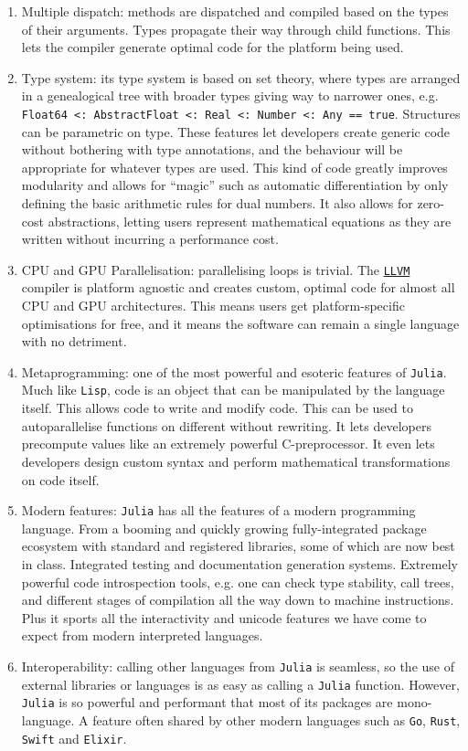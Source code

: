 \begin{enumerate}
    \item Multiple dispatch: methods are dispatched and compiled based on the types of their arguments. Types propagate their way through child functions. This lets the compiler generate optimal code for the platform being used.
    \item Type system: its type system is based on set theory, where types are arranged in a genealogical tree with broader types giving way to narrower ones, e.g. \texttt{Float64 <: AbstractFloat <: Real <: Number <: Any == true}. Structures can be parametric on type. These features let developers create generic code without bothering with type annotations, and the behaviour will be appropriate for whatever types are used. This kind of code greatly improves modularity and allows for ``magic'' such as automatic differentiation by only defining the basic arithmetic rules for dual numbers. It also allows for zero-cost abstractions, letting users represent mathematical equations as they are written without incurring a performance cost.
    \item CPU and GPU Parallelisation: parallelising loops is trivial. The \href{https://llvm.org/}{\texttt{LLVM}} compiler is platform agnostic and creates custom, optimal code for almost all CPU and GPU architectures. This means users get platform-specific optimisations for free, and it means the software can remain a single language with no detriment.
    \item Metaprogramming: one of the most powerful and esoteric features of \texttt{Julia}. Much like \texttt{Lisp}, code is an object that can be manipulated by the language itself. This allows code to write and modify code. This can be used to autoparallelise functions on different without rewriting. It lets developers precompute values like an extremely powerful C-preprocessor. It even lets developers design custom syntax and perform mathematical transformations on code itself.
    \item Modern features: \texttt{Julia} has all the features of a modern programming language. From a booming and quickly growing fully-integrated package ecosystem with standard and registered libraries, some of which are now best in class. Integrated testing and documentation generation systems. Extremely powerful code introspection tools, e.g. one can check type stability, call trees, and different stages of compilation all the way down to machine instructions. Plus it sports all the interactivity and unicode features we have come to expect from modern interpreted languages.
    \item Interoperability: calling other languages from \texttt{Julia} is seamless, so the use of external libraries or languages is as easy as calling a \texttt{Julia} function. However, \texttt{Julia} is so powerful and performant that most of its packages are mono-language. A feature often shared by other modern languages such as \texttt{Go}, \texttt{Rust}, \texttt{Swift} and \texttt{Elixir}.
\end{enumerate}

